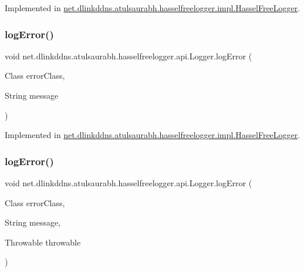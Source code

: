 Implemented in \mbox{\hyperlink{classnet_1_1dlinkddns_1_1atulsaurabh_1_1hasselfreelogger_1_1impl_1_1_hassel_free_logger_a94641af9c6c39ea601d5c41bf68a4b1f}{net.\+dlinkddns.\+atulsaurabh.\+hasselfreelogger.\+impl.\+Hassel\+Free\+Logger}}.

\mbox{\label{interfacenet_1_1dlinkddns_1_1atulsaurabh_1_1hasselfreelogger_1_1api_1_1_logger_adf72322be1f6a5eaf0cf1b491b430b06}} 
\subsubsection{\texorpdfstring{log\+Error()}{logError()}\hspace{0.1cm}{\footnotesize\ttfamily [2/3]}}
{\footnotesize\ttfamily void net.\+dlinkddns.\+atulsaurabh.\+hasselfreelogger.\+api.\+Logger.\+log\+Error (\begin{DoxyParamCaption}\item[{Class}]{error\+Class,  }\item[{String}]{message }\end{DoxyParamCaption})}



Implemented in \mbox{\hyperlink{classnet_1_1dlinkddns_1_1atulsaurabh_1_1hasselfreelogger_1_1impl_1_1_hassel_free_logger_a47870e52004c823f0ef365f5d41afd6b}{net.\+dlinkddns.\+atulsaurabh.\+hasselfreelogger.\+impl.\+Hassel\+Free\+Logger}}.

\mbox{\label{interfacenet_1_1dlinkddns_1_1atulsaurabh_1_1hasselfreelogger_1_1api_1_1_logger_a387cbc7fc16609202f2c63e88233ba49}} 
\subsubsection{\texorpdfstring{log\+Error()}{logError()}\hspace{0.1cm}{\footnotesize\ttfamily [3/3]}}
{\footnotesize\ttfamily void net.\+dlinkddns.\+atulsaurabh.\+hasselfreelogger.\+api.\+Logger.\+log\+Error (\begin{DoxyParamCaption}\item[{Class}]{error\+Class,  }\item[{String}]{message,  }\item[{Throwable}]{throwable }\end{DoxyParamCaption})}



